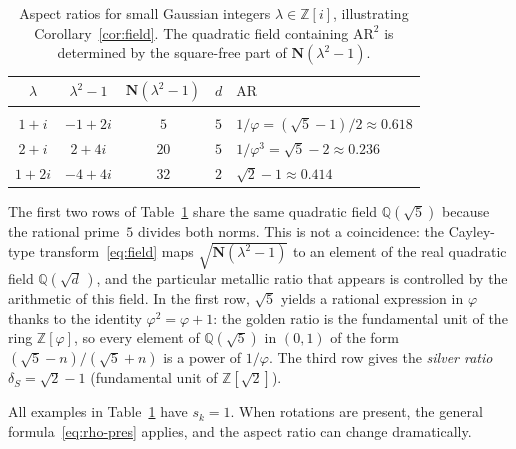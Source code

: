 \documentclass{amsart}
\theoremstyle{definition}
\theoremstyle{remark}
\begin{document}
\begin{table}[ht]
\centering
\small
\caption{Aspect ratios for small Gaussian integers $\lambda\in\mathbb{Z}[i]$,
illustrating Corollary~\ref{cor:field}.
The quadratic field containing $\mathrm{AR}^2$ is determined by the
square-free part of $\mathbf{N}(\lambda^2-1)$.}
\label{tab:examples}
\begin{tabular}{ccccl}
$\lambda$ & $\lambda^2-1$ & $\mathbf{N}(\lambda^2-1)$ & $d$ & $\mathrm{AR}$ \\[2pt]
\hline\\[-8pt]
$1+i$  & $-1+2i$  & $5$  & $5$ & $1/\varphi = (\sqrt{5}-1)/2 \approx 0.618$ \\
$2+i$  & $2+4i$   & $20$ & $5$ & $1/\varphi^3 = \sqrt{5}-2 \approx 0.236$ \\
$1+2i$ & $-4+4i$  & $32$ & $2$ & $\sqrt{2}-1 \approx 0.414$ \\
\end{tabular}
\end{table}

\noindent
The first two rows of Table~\ref{tab:examples} share the same quadratic
field $\mathbb{Q}(\sqrt{5})$
because the rational prime~$5$ divides both norms.
This is not a coincidence: the Cayley-type transform~\eqref{eq:field}
maps $\sqrt{\mathbf{N}(\lambda^2-1)}$ to an element of the
real quadratic field $\mathbb{Q}(\sqrt{d}\,)$, and the particular
metallic ratio that appears is controlled by the arithmetic of this field.
In the first row, $\sqrt{5}$ yields a rational expression in $\varphi$
thanks to the identity $\varphi^2 = \varphi+1$: the golden ratio is the
fundamental unit of the ring $\mathbb{Z}[\varphi]$, so every element of
$\mathbb{Q}(\sqrt{5})$ in $(0,1)$ of the form
$(\sqrt{5}-n)/(\sqrt{5}+n)$ is a power of $1/\varphi$.
The third row gives the \emph{silver ratio} $\delta_S = \sqrt{2}-1$
(fundamental unit of $\mathbb{Z}[\sqrt{2}]$).

All examples in Table~\ref{tab:examples} have $s_k=1$.
When rotations are present, the general formula~\eqref{eq:rho-pres}
applies, and the aspect ratio can change dramatically.
\end{document}
